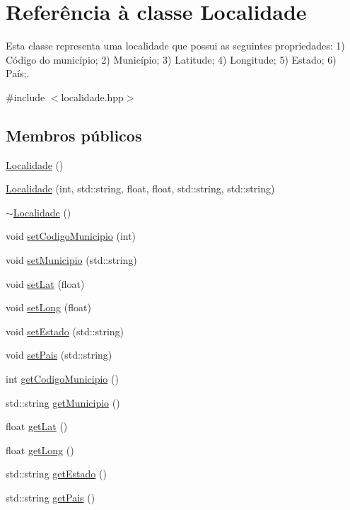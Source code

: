 \hypertarget{classLocalidade}{}\section{Referência à classe Localidade}
\label{classLocalidade}


Esta classe representa uma localidade que possui as seguintes propriedades\+: 1) Código do município; 2) Município; 3) Latitude; 4) Longitude; 5) Estado; 6) País;.  




{\ttfamily \#include $<$localidade.\+hpp$>$}

\subsection*{Membros públicos}
\begin{DoxyCompactItemize}
\item 
\hyperlink{classLocalidade_ae06850bc156d0e7fdc9b04b0a64d14bf}{Localidade} ()
\item 
\hyperlink{classLocalidade_afba433c839d548dac5a04b3ff5e90082}{Localidade} (int, std\+::string, float, float, std\+::string, std\+::string)
\item 
\hyperlink{classLocalidade_ab4bdecea35fe8bd89b67b6d505b8bae1}{$\sim$\+Localidade} ()
\item 
void \hyperlink{classLocalidade_a38bb0027272b4b39b88698dc5820fbc6}{set\+Codigo\+Municipio} (int)
\item 
void \hyperlink{classLocalidade_a90ac71109a4954863bb045a57e3fc29d}{set\+Municipio} (std\+::string)
\item 
void \hyperlink{classLocalidade_af9abc70199d4f50cd90add07c6d6e617}{set\+Lat} (float)
\item 
void \hyperlink{classLocalidade_a9b5f805c802337480712bf010669ced8}{set\+Long} (float)
\item 
void \hyperlink{classLocalidade_a71acb8cadaee73dbdf27a244cc9d5135}{set\+Estado} (std\+::string)
\item 
void \hyperlink{classLocalidade_af8e89f3bdcf8dd7bb1f3f74fdc8bc119}{set\+Pais} (std\+::string)
\item 
int \hyperlink{classLocalidade_af83a061d36464f5d91fefa5b68206112}{get\+Codigo\+Municipio} ()
\item 
std\+::string \hyperlink{classLocalidade_afd2127dad81d3131016f1dd4bcb9823b}{get\+Municipio} ()
\item 
float \hyperlink{classLocalidade_a1548cf9f09eca346af5bdcc4c6f222b6}{get\+Lat} ()
\item 
float \hyperlink{classLocalidade_a97a3f7eabe1cf45e3f0bed721d4641d4}{get\+Long} ()
\item 
std\+::string \hyperlink{classLocalidade_a3e32ae1802d8bd09568599f5133028d3}{get\+Estado} ()
\item 
std\+::string \hyperlink{classLocalidade_a03249330040cf75b6a964cced77526cf}{get\+Pais} ()
\end{DoxyCompactItemize}


